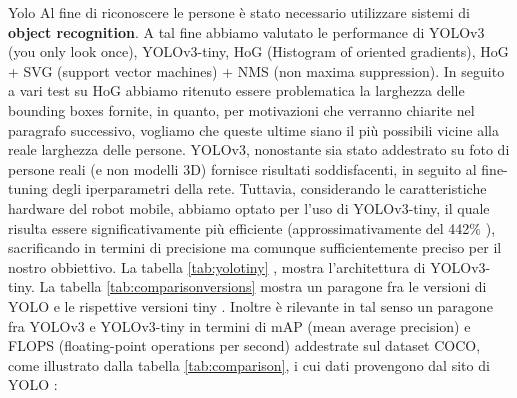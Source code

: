 \documentclass[10pt]{beamer}
\begin{document}
	\begin{frame}[allowframebreaks]{Yolo}
		Al fine di riconoscere le persone è stato necessario utilizzare sistemi di
		\textbf{object recognition}. A tal fine abbiamo valutato le performance di
		YOLOv3 (you only look once), YOLOv3-tiny, HoG (Histogram of oriented
		gradients), HoG + SVG (support vector machines) + NMS (non maxima
		suppression).  In seguito a vari test su HoG abbiamo ritenuto essere
		problematica la larghezza delle bounding boxes fornite, in quanto, per
		motivazioni che verranno chiarite nel paragrafo successivo, vogliamo che
		queste ultime siano il più possibili vicine alla reale larghezza delle
		persone. YOLOv3, nonostante sia stato addestrato su foto di persone reali
		(e non modelli 3D) fornisce risultati soddisfacenti, in seguito al
		fine-tuning degli iperparametri della rete. Tuttavia, considerando le
		caratteristiche hardware del robot mobile, abbiamo optato per l'uso di
		YOLOv3-tiny, il quale risulta essere significativamente più efficiente
		(approssimativamente del 442\% \cite{tiny_yolo}), sacrificando in termini
		di precisione ma comunque sufficientemente preciso per il nostro
		obbiettivo. La tabella \ref{tab:yolotiny} \cite{He2019TFYOLOAI}, mostra
		l'architettura di YOLOv3-tiny. La tabella \ref{tab:comparisonversions}
		mostra un paragone fra le versioni di YOLO e le rispettive versioni tiny
		\cite{tiny_yolo}. Inoltre è rilevante in tal senso un paragone fra YOLOv3 e
		YOLOv3-tiny in termini di mAP (mean average precision) e FLOPS
		(floating-point operations per second) addestrate sul dataset COCO, come
		illustrato dalla tabella \ref{tab:comparison}, i cui dati provengono dal
		sito di YOLO \cite{yolo}:
		
		\begin{table}[htpb]
			\centering
			\caption{Paragone fra le versioni di YOLO con rispettive versioni tiny}
			\label{tab:comparisonversions}
		\end{table}
		

\end{frame}
\end{document}
